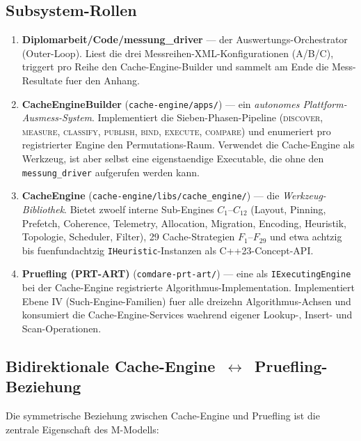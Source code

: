 \subsection{Subsystem-Rollen}

\begin{enumerate}
    \item \textbf{Diplomarbeit/Code/messung\_driver} --- der
    Auswertungs-Orchestrator (Outer-Loop). Liest die drei
    Messreihen-XML-Konfigurationen (A/B/C), triggert pro Reihe
    den Cache-Engine-Builder und sammelt am Ende die
    Mess-Resultate fuer den Anhang.

    \item \textbf{CacheEngineBuilder} (\texttt{cache-engine/apps/}) ---
    ein \emph{autonomes Plattform-Ausmess-System}. Implementiert die
    Sieben-Phasen-Pipeline (\textsc{discover}, \textsc{measure},
    \textsc{classify}, \textsc{publish}, \textsc{bind},
    \textsc{execute}, \textsc{compare}) und enumeriert
    pro registrierter Engine den Permutations-Raum. Verwendet die
    Cache-Engine als Werkzeug, ist aber selbst eine eigenstaendige
    Executable, die ohne den \texttt{messung\_driver} aufgerufen
    werden kann.

    \item \textbf{CacheEngine} (\texttt{cache-engine/libs/cache\_engine/}) ---
    die \emph{Werkzeug-Bibliothek}. Bietet zwoelf interne
    Sub-Engines $C_1$--$C_{12}$ (Layout, Pinning, Prefetch,
    Coherence, Telemetry, Allocation, Migration, Encoding, Heuristik,
    Topologie, Scheduler, Filter), 29 Cache-Strategien $F_1$--$F_{29}$
    und etwa achtzig bis fuenfundachtzig
    \texttt{IHeuristic}-Instanzen als C++23-Concept-API.

    \item \textbf{Pruefling (PRT-ART)} (\texttt{comdare-prt-art/}) ---
    eine als \texttt{IExecutingEngine} bei der Cache-Engine
    registrierte Algorithmus-Implementation. Implementiert
    Ebene IV (Such-Engine-Familien) fuer alle dreizehn
    Algorithmus-Achsen und konsumiert die Cache-Engine-Services
    waehrend eigener Lookup-, Insert- und Scan-Operationen.
\end{enumerate}

\subsection{Bidirektionale Cache-Engine~$\leftrightarrow$~Pruefling-Beziehung}

Die symmetrische Beziehung zwischen Cache-Engine und Pruefling
ist die zentrale Eigenschaft des M-Modells:


